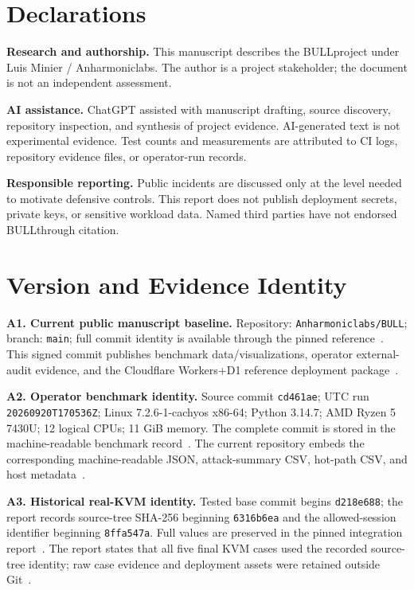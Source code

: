 \documentclass[journal]{IEEEtran}
\newcommand{\bull}{\textsc{BULL}}
\newcommand{\benchshort}{\texttt{cd461ae}}
\begin{document}
\section*{Declarations}
\textbf{Research and authorship.} This manuscript describes the \bull project under Luis Minier / Anharmoniclabs. The author is a project stakeholder; the document is not an independent assessment.

\textbf{AI assistance.} ChatGPT assisted with manuscript drafting, source discovery, repository inspection, and synthesis of project evidence. AI-generated text is not experimental evidence. Test counts and measurements are attributed to CI logs, repository evidence files, or operator-run records.

\textbf{Responsible reporting.} Public incidents are discussed only at the level needed to motivate defensive controls. This report does not publish deployment secrets, private keys, or sensitive workload data. Named third parties have not endorsed \bull through citation.

\appendices

\section{Version and Evidence Identity}
\textbf{A1. Current public manuscript baseline.} Repository: \texttt{Anharmoniclabs/BULL}; branch: \texttt{main}; full commit identity is available through the pinned reference~\cite{BULL_CurrentMain}.
This signed commit publishes benchmark data/visualizations, operator external-audit evidence, and the Cloudflare Workers+D1 reference deployment package~\cite{BULL_CurrentMain}.

\textbf{A2. Operator benchmark identity.} Source commit \benchshort; UTC run \texttt{20260920T170536Z}; Linux 7.2.6-1-cachyos x86-64; Python 3.14.7; AMD Ryzen 5 7430U; 12 logical CPUs; 11 GiB memory. The complete commit is stored in the machine-readable benchmark record~\cite{BULL_BenchmarkJSON}.
The current repository embeds the corresponding machine-readable JSON, attack-summary CSV, hot-path CSV, and host metadata~\cite{BULL_BenchmarkJSON}.

\textbf{A3. Historical real-KVM identity.} Tested base commit begins \texttt{d218e688}; the report records source-tree SHA-256 beginning \texttt{6316b6ea} and the allowed-session identifier beginning \texttt{8ffa547a}. Full values are preserved in the pinned integration report~\cite{BULL_MicroVMReport}.
The report states that all five final KVM cases used the recorded source-tree identity; raw case evidence and deployment assets were retained outside Git~\cite{BULL_MicroVMReport}.
\end{document}

